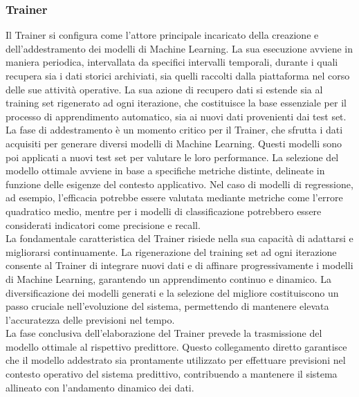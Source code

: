 \subsubsection[Trainer]{Trainer}
Il Trainer si configura come l'attore principale incaricato della creazione e dell'addestramento dei modelli di Machine Learning.
La sua esecuzione avviene in maniera periodica, intervallata da specifici intervalli temporali, durante i quali recupera sia i dati storici archiviati, sia quelli raccolti dalla piattaforma nel corso delle sue attività operative.
La sua azione di recupero dati si estende sia al training set rigenerato ad ogni iterazione, che costituisce la base essenziale per il processo di apprendimento automatico, sia ai nuovi dati provenienti dai test set. \\
La fase di addestramento è un momento critico per il Trainer, che sfrutta i dati acquisiti per generare diversi modelli di Machine Learning.
Questi modelli sono poi applicati a nuovi test set per valutare le loro performance.
La selezione del modello ottimale avviene in base a specifiche metriche distinte, delineate in funzione delle esigenze del contesto applicativo.
Nel caso di modelli di regressione, ad esempio, l'efficacia potrebbe essere valutata mediante metriche come l'errore quadratico medio, mentre per i modelli di classificazione potrebbero essere considerati indicatori come precisione e recall. \\
La fondamentale caratteristica del Trainer risiede nella sua capacità di adattarsi e migliorarsi continuamente.
La rigenerazione del training set ad ogni iterazione consente al Trainer di integrare nuovi dati e di affinare progressivamente i modelli di Machine Learning, garantendo un apprendimento continuo e dinamico.
La diversificazione dei modelli generati e la selezione del migliore costituiscono un passo cruciale nell'evoluzione del sistema, permettendo di mantenere elevata l'accuratezza delle previsioni nel tempo. \\
La fase conclusiva dell'elaborazione del Trainer prevede la trasmissione del modello ottimale al rispettivo predittore.
Questo collegamento diretto garantisce che il modello addestrato sia prontamente utilizzato per effettuare previsioni nel contesto operativo del sistema predittivo, contribuendo a mantenere il sistema allineato con l'andamento dinamico dei dati. \\

